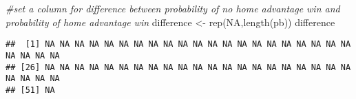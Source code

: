 \documentclass[
]{article}
\newenvironment{Shaded}{\begin{snugshade}}{\end{snugshade}}
\newcommand{\CommentTok}[1]{\textcolor[rgb]{0.56,0.35,0.01}{\textit{#1}}}
\newcommand{\ConstantTok}[1]{\textcolor[rgb]{0.00,0.00,0.00}{#1}}
\newcommand{\FunctionTok}[1]{\textcolor[rgb]{0.00,0.00,0.00}{#1}}
\newcommand{\NormalTok}[1]{#1}
\newcommand{\OtherTok}[1]{\textcolor[rgb]{0.56,0.35,0.01}{#1}}
\begin{document}
\begin{Shaded}
\begin{Highlighting}[]
\CommentTok{\#set a column for difference between probability of no home advantage win and probability of home advantage win}
\NormalTok{difference }\OtherTok{\textless{}{-}} \FunctionTok{rep}\NormalTok{(}\ConstantTok{NA}\NormalTok{,}\FunctionTok{length}\NormalTok{(pb))}
\NormalTok{difference }
\end{Highlighting}
\end{Shaded}

\begin{verbatim}
##  [1] NA NA NA NA NA NA NA NA NA NA NA NA NA NA NA NA NA NA NA NA NA NA NA NA NA
## [26] NA NA NA NA NA NA NA NA NA NA NA NA NA NA NA NA NA NA NA NA NA NA NA NA NA
## [51] NA
\end{verbatim}
\end{document}
